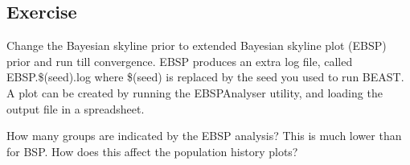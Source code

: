 \documentclass[12pt]{article}
\begin{document}
\subsection{Exercise}
Change the Bayesian skyline prior to extended Bayesian skyline plot (EBSP) prior and run
till convergence. EBSP produces an extra log file, called EBSP.\$(seed).log where \$(seed)
is replaced by the seed you used to run BEAST.
A plot can be created by running the EBSPAnalyser utility, and loading the output file
in a spreadsheet.

How many groups are indicated by the EBSP analysis?
This is much lower than for BSP. How does this affect the population history plots?

 

\end{document}
